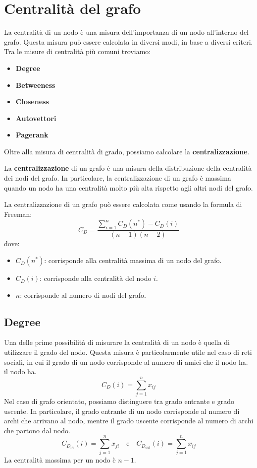 \section{Centralità del grafo}
La centralità di un nodo è una misura dell'importanza di un nodo all'interno
del grafo. Questa misura può essere calcolata in diversi modi, in base a
diversi criteri. Tra le misure di centralità più comuni troviamo:
\begin{itemize}
    \item \textbf{Degree}
    \item \textbf{Betweeness}
    \item \textbf{Closeness}
    \item \textbf{Autovettori}
    \item \textbf{Pagerank}
\end{itemize}
Oltre alla misura di centralità di grado, possiamo calcolare la \textbf{centralizzazione}.
\begin{definizione}
    La \textbf{centralizzazione} di un grafo è una misura della distribuzione
    della centralità dei nodi del grafo. In particolare, la centralizzazione
    di un grafo è massima quando un nodo ha una centralità molto più alta
    rispetto agli altri nodi del grafo.
\end{definizione}

La centralizzazione di un grafo può essere calcolata come usando la formula di Freeman:
\begin{equation}
    C_D = \frac{\sum_{i=1}^{n} C_D(n^\ast) - C_D(i)}{(n - 1)(n - 2)}
\end{equation}
dove:
\begin{itemize}
    \item $C_D(n^\ast)$: corrisponde alla centralità massima di un nodo del grafo.
    \item $C_D(i)$: corrisponde alla centralità del nodo $i$.
    \item $n$: corrisponde al numero di nodi del grafo.
\end{itemize}
\subsection{Degree}
Una delle prime possibilità di misurare la centralità di un nodo è quella di
utilizzare il grado del nodo. Questa misura è particolarmente utile nel caso di
reti sociali, in cui il grado di un nodo corrisponde al numero di amici che
il nodo ha.
il nodo ha.
\begin{equation}
    C_D(i) = \sum_{j=1}^{n} x_{ij}
\end{equation}
Nel caso di grafo orientato, possiamo distinguere tra grado entrante e grado
uscente. In particolare, il grado entrante di un nodo corrisponde al numero di
archi che arrivano al nodo, mentre il grado uscente corrisponde al numero di
archi che partono dal nodo.
\begin{equation}
    C_{D_{in}}(i) = \sum_{j=1}^{n} x_{ji} \quad \text{e} \quad
    C_{D_{out}}(i) = \sum_{j=1}^{n} x_{ij}
\end{equation}
La centralità massima per un nodo è $n - 1$.

